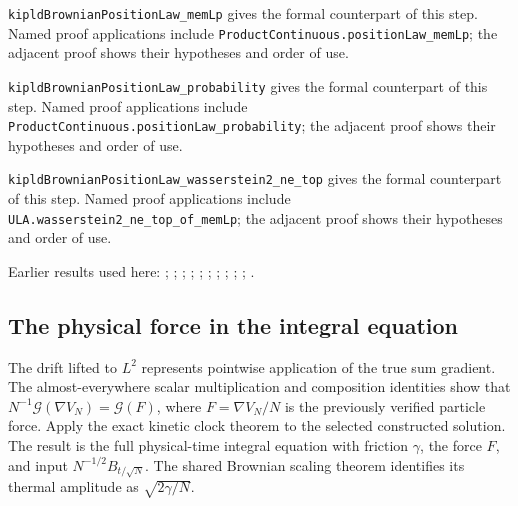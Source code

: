 \documentclass[11pt,a4paper]{report}
\begin{document}
\begin{leanbox}
\texttt{kipld\allowbreak{}Brownian\allowbreak{}Position\allowbreak{}Law\_\allowbreak{}mem\allowbreak{}Lp} gives the formal counterpart of this step. Named proof applications include \texttt{Product\allowbreak{}Continuous.\allowbreak{}position\allowbreak{}Law\_\allowbreak{}mem\allowbreak{}Lp}; the adjacent proof shows their hypotheses and order of use.




\texttt{kipld\allowbreak{}Brownian\allowbreak{}Position\allowbreak{}Law\_\allowbreak{}probability} gives the formal counterpart of this step. Named proof applications include \texttt{Product\allowbreak{}Continuous.\allowbreak{}position\allowbreak{}Law\_\allowbreak{}probability}; the adjacent proof shows their hypotheses and order of use.




\texttt{kipld\allowbreak{}Brownian\allowbreak{}Position\allowbreak{}Law\_\allowbreak{}wasserstein2\_\allowbreak{}ne\_\allowbreak{}top} gives the formal counterpart of this step. Named proof applications include \texttt{ULA.\allowbreak{}wasserstein2\_\allowbreak{}ne\_\allowbreak{}top\_\allowbreak{}of\_\allowbreak{}mem\allowbreak{}Lp}; the adjacent proof shows their hypotheses and order of use.
\end{leanbox}


Earlier results used here: \cite[Section~3.17.3]{LangevinLean2026ULASC}; \cite[Section~3.17.4]{LangevinLean2026ULASC}; \cite[Section~3.21.2]{LangevinLean2026ULASC}; \cite[Section~3.26.15]{LangevinLean2026ULASC}; \cite[Section~3.1.1]{LangevinLean2026IPLA}; \cite[Section~3.1.3]{LangevinLean2026IPLA}; \cite[Section~3.1.4]{LangevinLean2026IPLA}; \cite[Section~3.3.2]{LangevinLean2026IPLA}; \cite[Section~3.5.1]{LangevinLean2026IPLA}; \cite[Section~3.19.1]{LangevinLean2026Kinetic}; \cite[Section~3.58.4]{LangevinLean2026Kinetic}.
\subsection{\texorpdfstring{The physical force in the integral equation}{The physical force in the integral equation}}
\label{report-step-KIPLMC-Continuous-lean-4}


The drift lifted to \(L^{2}\) represents pointwise application of the true sum gradient. The almost-everywhere scalar multiplication and composition identities show that \(N^{-1}\mathcal G(\nabla V_N)=\mathcal G(F)\), where \(F=\nabla V_N/N\) is the previously verified particle force. Apply the exact kinetic clock theorem to the selected constructed solution. The result is the full physical-time integral equation with friction \(\gamma\), the force \(F\), and input \(N^{-1/2}B_{t/\sqrt N}\). The shared Brownian scaling theorem identifies its thermal amplitude as \(\sqrt{2\gamma/N}\).
\end{document}
